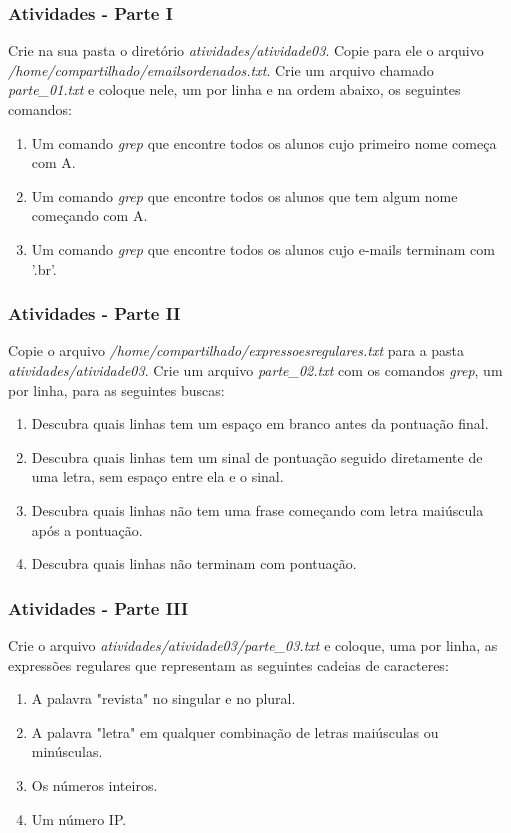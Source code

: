 \documentclass{beamer}
\begin{document}
   \begin{frame}
      \frametitle{Atividades - Parte I}
      Crie na sua pasta o diretório \textit{atividades/atividade03}. Copie para ele o arquivo \textit{/home/compartilhado/emailsordenados.txt}. Crie um arquivo chamado \textit{parte\_01.txt} e coloque nele, um por linha e na ordem abaixo, os seguintes comandos:
      \begin{enumerate}
         \item Um comando \textit{grep} que encontre todos os alunos cujo primeiro nome começa com A.
	 \item Um comando \textit{grep} que encontre todos os alunos que tem algum nome começando com A.
	 \item Um comando \textit{grep} que encontre todos os alunos cujo e-mails terminam com '.br'.
      \end{enumerate}
   \end{frame}

   \begin{frame}
      \frametitle{Atividades - Parte II}
      Copie o arquivo \textit{/home/compartilhado/expressoesregulares.txt} para a pasta \textit{atividades/atividade03}. Crie um arquivo \textit{parte\_02.txt} com os comandos \textit{grep}, um por linha, para as seguintes buscas:
      \begin{enumerate}
         \item Descubra quais linhas tem um espaço em branco antes da pontuação final.
	 \item Descubra quais linhas tem um sinal de pontuação seguido diretamente de uma letra, sem espaço entre ela e o sinal.
	 \item Descubra quais linhas não tem uma frase começando com letra maiúscula após a pontuação.
	 \item Descubra quais linhas não terminam com pontuação.
      \end{enumerate}
   \end{frame}

   \begin{frame}
      \frametitle{Atividades - Parte III}
      Crie o arquivo \textit{atividades/atividade03/parte\_03.txt} e coloque, uma por linha, as expressões regulares que representam as seguintes cadeias de caracteres:
      \begin{enumerate}
         \item A palavra "revista" no singular e no plural.
	 \item A palavra "letra" em qualquer combinação de letras maiúsculas ou minúsculas.
	 \item Os números inteiros.
	 \item Um número IP.
      \end{enumerate}
   \end{frame}
\end{document}
